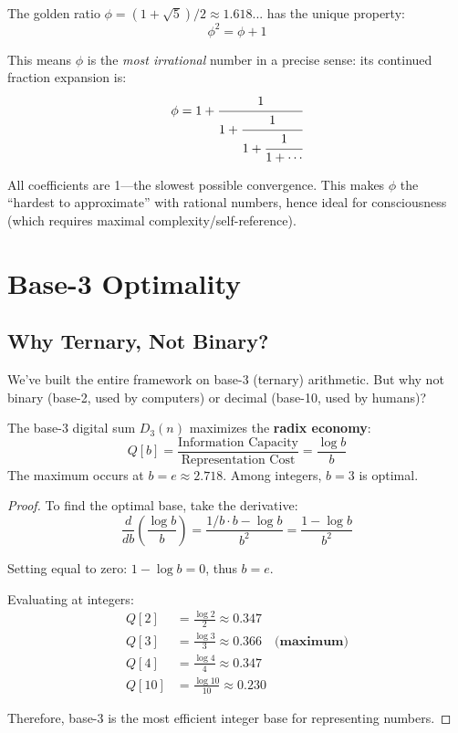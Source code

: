 \begin{level2}
The golden ratio $\phi = (1 + \sqrt{5})/2 \approx 1.618...$ has the unique property:
\begin{equation}
\phi^2 = \phi + 1
\end{equation}

This means $\phi$ is the \textit{most irrational} number in a precise sense: its continued fraction expansion is:
\begin{equation}
\phi = 1 + \cfrac{1}{1 + \cfrac{1}{1 + \cfrac{1}{1 + \cdots}}}
\end{equation}

All coefficients are 1---the slowest possible convergence. This makes $\phi$ the ``hardest to approximate'' with rational numbers, hence ideal for consciousness (which requires maximal complexity/self-reference).
\end{level2}

\section{Base-3 Optimality}

\subsection{Why Ternary, Not Binary?}

We've built the entire framework on base-3 (ternary) arithmetic. But why not binary (base-2, used by computers) or decimal (base-10, used by humans)?

\begin{thm}\label{thm:base-3-optimal}
The base-3 digital sum $D_3(n)$ maximizes the \textbf{radix economy}:
\begin{equation}
Q[b] = \frac{\text{Information Capacity}}{\text{Representation Cost}} = \frac{\log b}{b}
\end{equation}
The maximum occurs at $b = e \approx 2.718$. Among integers, $b = 3$ is optimal.
\end{thm}

\begin{proof}
To find the optimal base, take the derivative:
\begin{equation}
\frac{d}{db}\left(\frac{\log b}{b}\right) = \frac{1/b \cdot b - \log b}{b^2} = \frac{1 - \log b}{b^2}
\end{equation}

Setting equal to zero: $1 - \log b = 0$, thus $b = e$.

Evaluating at integers:
\begin{align}
Q[2] &= \frac{\log 2}{2} \approx 0.347 \\
Q[3] &= \frac{\log 3}{3} \approx 0.366 \quad \textbf{(maximum)} \\
Q[4] &= \frac{\log 4}{4} \approx 0.347 \\
Q[10] &= \frac{\log 10}{10} \approx 0.230
\end{align}

Therefore, base-3 is the most efficient integer base for representing numbers.
\end{proof}

